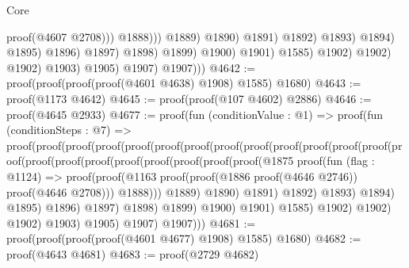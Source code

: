 \begin{lexlean}{Core}
\begin{coremodule}
                                                                proof(@4607 @2708)))
                                                          @1888)))
                                                  @1889)
                                                @1890)
                                              @1891)
                                            @1892)
                                          @1893)
                                        @1894)
                                      @1895)
                                    @1896)
                                  @1897)
                                @1898)
                              @1899)
                            @1900)
                          @1901)
                        @1585)
                      @1902)
                    @1902)
                  @1902)
                @1903)
              @1905)
            @1907)
          @1907)))
@4642 := proof(proof(proof(proof(@4601 @4638) @1908) @1585) @1680)
@4643 := proof(@1173 @4642)
@4645 := proof(proof(@107 @4602) @2886)
@4646 := proof(@4645 @2933)
@4677 := proof(fun (conditionValue : @1) =>
    proof(fun (conditionSteps : @7) =>
      proof(proof(proof(proof(proof(proof(proof(proof(proof(proof(proof(proof(proof(proof(proof(proof(proof(proof(proof(proof(proof(proof(@1875
                                                    proof(fun (flag : @1124) =>
                                                      proof(proof(@1163
                                                            proof(proof(@1886 proof(@4646 @2746))
                                                                proof(@4646 @2708)))
                                                          @1888)))
                                                  @1889)
                                                @1890)
                                              @1891)
                                            @1892)
                                          @1893)
                                        @1894)
                                      @1895)
                                    @1896)
                                  @1897)
                                @1898)
                              @1899)
                            @1900)
                          @1901)
                        @1585)
                      @1902)
                    @1902)
                  @1902)
                @1903)
              @1905)
            @1907)
          @1907)))
@4681 := proof(proof(proof(proof(@4601 @4677) @1908) @1585) @1680)
@4682 := proof(@4643 @4681)
@4683 := proof(@2729 @4682)

\end{coremodule}
\end{lexlean}
